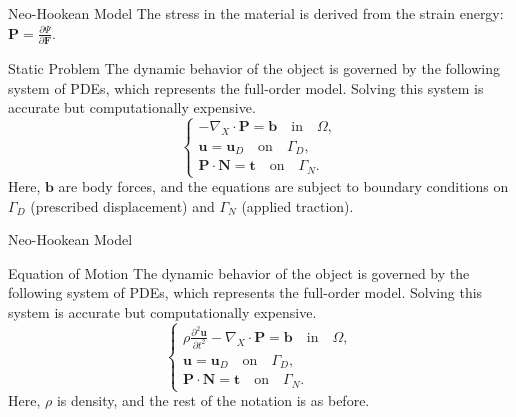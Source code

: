 \documentclass{beamer}
\begin{document}
\begin{frame}{Neo-Hookean Model}
    The stress in the material is derived from the strain energy: \(\bm{P} = \frac{\partial \Psi}{\partial \bm{F}}\).
    
    \begin{block}{Static Problem}
        The dynamic behavior of the object is governed by the following system of PDEs, which represents the full-order model. Solving this system is accurate but computationally expensive.
        \begin{equation}
            \begin{cases}
                - \nabla_X \cdot \bm{P} = \bm{b} \quad \text{in} \quad \Omega, \\
                \bm{u} = \bm{u}_D \quad \text{on} \quad \Gamma_D, \\
                \bm{P} \cdot \bm{N} = \bm{t} \quad \text{on} \quad \Gamma_N.
            \end{cases}
        \end{equation}
        Here, \(\bm{b}\) are body forces, and the equations are subject to boundary conditions on \(\Gamma_D\) (prescribed displacement) and \(\Gamma_N\) (applied traction).
    \end{block}
\end{frame}

\begin{frame}{Neo-Hookean Model}    
    \begin{block}{Equation of Motion}
        The dynamic behavior of the object is governed by the following system of PDEs, which represents the full-order model. Solving this system is accurate but computationally expensive.
        \begin{equation}
            \begin{cases}
                \rho \frac{\partial^2 \bm{u}}{\partial t^2} - \nabla_X \cdot \bm{P} = \bm{b} \quad \text{in} \quad \Omega, \\
                \bm{u} = \bm{u}_D \quad \text{on} \quad \Gamma_D, \\
                \bm{P} \cdot \bm{N} = \bm{t} \quad \text{on} \quad \Gamma_N.
            \end{cases}
        \end{equation}
        Here, \(\rho\) is density, and the rest of the notation is as before.
    \end{block}
\end{frame}
\end{document}
